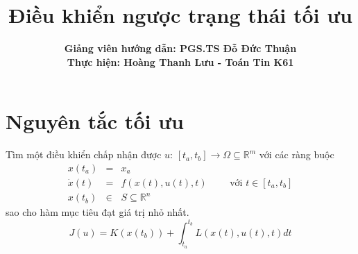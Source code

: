 \documentclass[11pt]{beamer}
\begin{document}
	\author[Hoàng Thanh Lưu (Toán Tin K61)]{\textbf{Giảng viên hướng dẫn: PGS.TS Đỗ Đức Thuận\\
			Thực hiện: Hoàng Thanh Lưu - Toán Tin K61}}
	\title{\textbf{Điều khiển ngược trạng thái tối ưu}}
	\begin{frame}[plain]
		\maketitle
	\end{frame}
\begin{frame}
	\tableofcontents
\end{frame}

	\section{Nguyên tắc tối ưu}

\begin{frame}
	Tìm một điều khiển chấp nhận được $u$: $[t_a, t_b] \to \Omega \subseteq \mathbb{R}^m$ với các ràng buộc 
	\begin{eqnarray}
	x(t_a) &=& x_a \nonumber \\ \dot{x}(t) &=& f(x(t), u(t), t) \qquad \text{ với } t \in [t_a, t_b] \nonumber \\ x(t_b)&\in& S \subseteq \mathbb{R}^n \nonumber
	\end{eqnarray} 
	sao cho hàm mục tiêu đạt giá trị nhỏ nhất. 
	$$J(u) = K(x(t_b)) + \int_{t_a}^{t_b}L(x(t),u(t), t)dt$$
\end{frame}
\end{document}
